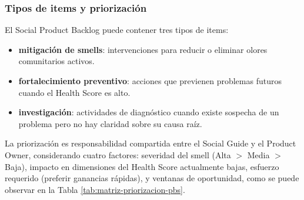 \subsubsection{Tipos de items y priorización}

El Social Product Backlog puede contener tres tipos de items:
\begin{itemize}
    \item \textbf{mitigación de smells}: intervenciones para reducir o eliminar olores comunitarios activos.
    \item \textbf{fortalecimiento preventivo}: acciones que previenen problemas futuros cuando el Health Score es alto.
    \item \textbf{investigación}: actividades de diagnóstico cuando existe sospecha de un problema pero no hay claridad sobre su causa raíz.
\end{itemize}

La priorización es responsabilidad compartida entre el Social Guide y el Product Owner, considerando cuatro factores: severidad del smell (Alta $>$ Media $>$ Baja), impacto en dimensiones del Health Score actualmente bajas, esfuerzo requerido (preferir ganancias rápidas), y ventanas de oportunidad, como se puede observar en la Tabla \ref{tab:matriz-priorizacion-pbs}.

\begingroup
\scriptsize
\renewcommand{\arraystretch}{1.4}
\setlength{\tabcolsep}{4pt}
\setlength{\LTleft}{0pt}
\setlength{\LTright}{0pt}

